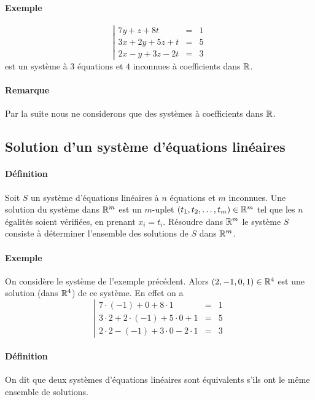 \paragraph{Exemple}
$$\left\vert \begin{array}{rcl}
  7 y + z + 8 t & = & 1 \\
  3 x + 2 y + 5 z + t & = & 5 \\
  2 x - y + 3 z - 2 t & = & 3
\end{array} \right.$$
est un système à $3$ équations et $4$ inconnues à coefficients dans $\mathbb{R}$.

\paragraph{Remarque} Par la suite nous ne considerons que des systèmes à coefficients dans $\mathbb{R}$.

%
\subsection{Solution d'un système d'équations linéaires}
%
\paragraph{Définition} Soit $S$ un système d'équations linéaires à $n$ équations et $m$ inconnues. Une solution du système dans $\mathbb{R}^m$ est un $m$-uplet $(t_1, t_2, \ldots, t_m) \in \mathbb{R}^m$ tel que les $n$ égalités soient vérifiées, en prenant $x_i = t_i$. Résoudre dans $\mathbb{R}^m$ le système $S$ consiste à déterminer l'ensemble des solutions de $S$ dans $\mathbb{R}^m$.

\paragraph{Exemple} On considère le système de l'exemple précédent. Alors $(2, -1, 0, 1) \in \mathbb{R}^4$ est une solution (dans $\mathbb{R}^4$) de ce système. En effet on a
$$\left\vert \begin{array}{rcl}
  7 \cdot (-1) + 0 + 8 \cdot 1 & = & 1 \\
  3 \cdot 2 + 2 \cdot (-1) + 5 \cdot 0 + 1 & = & 5 \\
  2 \cdot 2 - (-1) + 3 \cdot 0 - 2 \cdot 1 & = & 3
\end{array} \right.$$

\paragraph{Définition} On dit que deux systèmes d'équations linéaires sont équivalents s'ils ont le même ensemble de solutions.

